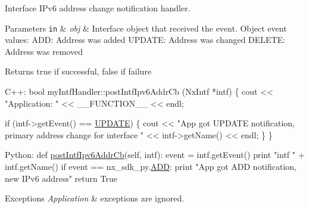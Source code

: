 Interface I\+Pv6 address change notification handler. 
\begin{DoxyParams}[1]{Parameters}
\mbox{\tt in}  & {\em obj} & Interface object that received the event. Object event values\+: A\+DD\+: Address was added U\+P\+D\+A\+TE\+: Address was changed D\+E\+L\+E\+TE\+: Address was removed \\
\hline
\end{DoxyParams}
\begin{DoxyReturn}{Returns}
true if successful, false if failure
\end{DoxyReturn}

\begin{DoxyCode}
C++:
     \textcolor{keywordtype}{bool}
     myIntfHandler::postIntfIpv6AddrCb (NxIntf *intf)
     \{
        cout << \textcolor{stringliteral}{"Application: "} << \_\_FUNCTION\_\_ << endl;

        \textcolor{keywordflow}{if} (intf->getEvent() == \mbox{\hyperlink{namespacenxos_af9a9040b7681199d386e94eb888018cba4f3a5ababd9a5356d642a492f5ccc371}{UPDATE}}) \{
          cout << \textcolor{stringliteral}{"App got UPDATE notification, primary address change}
\textcolor{stringliteral}{                   for interface "} <<  intf->getName() << endl;
        \}
     \}

Python:   
     def \mbox{\hyperlink{classnxos_1_1_nx_intf_mgr_handler_ad845ed26b457bc0bdc7a9c79a94acdaf}{postIntfIpv6AddrCb}}(\textcolor{keyword}{self}, intf):
         event = intf.getEvent()
         print \textcolor{stringliteral}{"intf "} + intf.getName()
         if event == nx\_sdk\_py.\mbox{\hyperlink{namespacenxos_af9a9040b7681199d386e94eb888018cba93d8c810253e44a0fd5f3d8d26032ad5}{ADD}}:
            print \textcolor{stringliteral}{"App got ADD notification, new IPv6 address"}
         return True
\end{DoxyCode}



\begin{DoxyExceptions}{Exceptions}
{\em Application} & exceptions are ignored. \\
\hline
\end{DoxyExceptions}
\mbox{\label{classnxos_1_1_nx_intf_mgr_handler_aca73f02d8ce050cb1bb44fddc6338f76}} 
